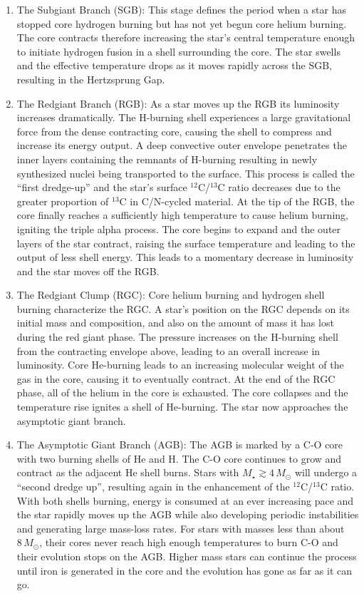 \begin{enumerate}
%
\item The Subgiant Branch (SGB): This stage defines the period when a star has stopped core hydrogen burning but has not yet begun core helium burning. The core contracts therefore increasing the star's central temperature enough to initiate hydrogen fusion in a shell surrounding the core. The star swells and the effective temperature drops as it moves rapidly across the SGB, resulting in the Hertzsprung Gap.
%
\item The Redgiant Branch (RGB): As a star moves up the RGB its luminosity increases dramatically. The H-burning shell experiences a large gravitational force from the dense contracting core, causing the shell to compress and increase its energy output. A deep convective outer envelope penetrates the inner layers containing the remnants of H-burning resulting in newly synthesized nuclei being transported to the surface. This process is called the ``first dredge-up'' and the star's surface $^{12}$C/$^{13}$C ratio decreases due to the greater proportion of $^{13}$C in C/N-cycled material. At the tip of the RGB, the core finally reaches a sufficiently high temperature to cause helium burning, igniting the triple alpha process. The core begins to expand and the outer layers of the star contract, raising the surface temperature and leading to the output of less shell energy. This leads to a momentary decrease in luminosity and the star moves off the RGB.
%
\item The Redgiant Clump (RGC): Core helium burning and hydrogen shell burning characterize the RGC. A star's position on the RGC depends on its initial mass and composition, and  also on the amount of mass it has lost during the red giant phase. The pressure increases on the H-burning shell from the contracting envelope above, leading to an overall increase in luminosity. Core He-burning leads to an increasing molecular weight of the gas in the core, causing it to eventually contract. At the end of the RGC phase, all of the helium in the core is exhausted. The core collapses and the temperature rise ignites a shell of He-burning. The star now approaches the asymptotic giant branch.
%
\item The Asymptotic Giant Branch (AGB): The AGB is marked by a C-O core with two burning shells of He and H. The C-O core continues to grow and contract as the adjacent He shell burns. Stars with $M_{\star} \gtrsim 4\,M_{\odot}$ will undergo a ``second dredge up'', resulting again in the enhancement of the $^{12}$C/$^{13}$C ratio. With both shells burning, energy is consumed at an ever increasing pace and the star rapidly moves up the AGB while also developing periodic instabilities and generating large mass-loss rates. For stars with masses less than about $8\,M_{\odot}$, their cores never reach high enough temperatures to burn C-O and their evolution stops on the AGB. Higher mass stars can continue the process until iron is generated in the core and the evolution has gone as far as it can go.
\end{enumerate}
